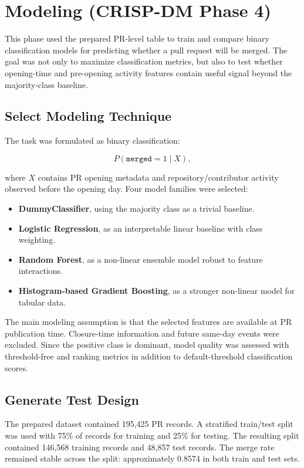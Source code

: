 \clearpage
\section{Modeling (CRISP-DM Phase 4)}

This phase used the prepared PR-level table to train and compare binary classification models for predicting
whether a pull request will be merged. The goal was not only to maximize classification metrics, but also to
test whether opening-time and pre-opening activity features contain useful signal beyond the majority-class baseline.

\subsection{Select Modeling Technique}

The task was formulated as binary classification:

\[
    P(\texttt{merged}=1 \mid X),
\]

where \(X\) contains PR opening metadata and repository/contributor activity observed before the opening day.
Four model families were selected:

\begin{itemize}
    \item \textbf{DummyClassifier}, using the majority class as a trivial baseline.
    \item \textbf{Logistic Regression}, as an interpretable linear baseline with class weighting.
    \item \textbf{Random Forest}, as a non-linear ensemble model robust to feature interactions.
    \item \textbf{Histogram-based Gradient Boosting}, as a stronger non-linear model for tabular data.
\end{itemize}

The main modeling assumption is that the selected features are available at PR publication time. Closure-time
information and future same-day events were excluded. Since the positive class is dominant, model quality was
assessed with threshold-free and ranking metrics in addition to default-threshold classification scores.

\subsection{Generate Test Design}

The prepared dataset contained 195,425 PR records. A stratified train/test split was used with 75\% of
records for training and 25\% for testing. The resulting split contained 146,568 training records and 48,857
test records. The merge rate remained stable across the split: approximately 0.8574 in both train and test sets.

